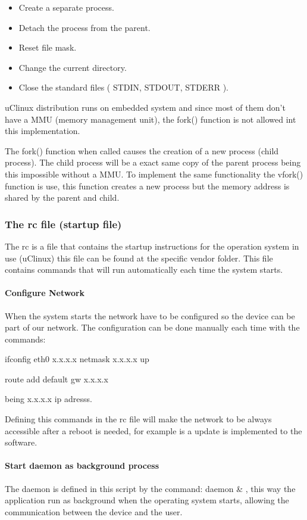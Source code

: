 \begin{itemize}
	\item Create a separate process.
	\item Detach the process from the parent.
	\item Reset file mask.
	\item Change the current directory.
	\item Close the standard files ( STDIN, STDOUT, STDERR ).
\end{itemize}

uClinux distribution runs on embedded system and since most of them don't have a MMU (memory management unit), the fork() function is not allowed int this implementation.

The fork() function when called causes the creation of a new process (child process). The child process will be a exact same copy of the parent process being this impossible without a MMU.
To implement the same functionality the vfork() function is use, this function creates a new process but the memory address is shared by the parent and child.

\subsubsection{The rc file (startup file)}
The rc is a file that contains the startup instructions for the operation system in use (uClinux) this file can be found at the specific vendor folder. 
This file contains commands that will run automatically each time the system starts.
\paragraph{Configure Network}
When the system starts the network have to be configured so the device can be part of our network. The configuration can be done manually each time with the commands:

ifconfig eth0 x.x.x.x netmask x.x.x.x up

route add default gw x.x.x.x

being x.x.x.x ip adresss.

Defining this commands in the rc file will make the network to be always accessible after a reboot is needed, for example is a update is implemented to the software. 

\paragraph{Start daemon as background process}
The daemon is defined in this script by the command: daemon \& , this way the application run as background when the operating system starts, allowing the communication between the device and the user.

